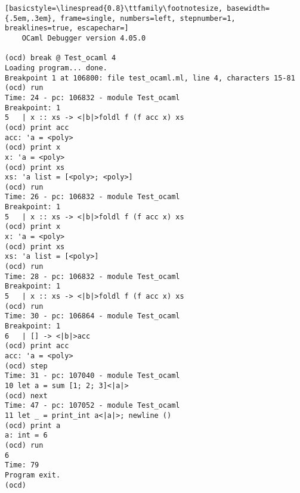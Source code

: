 \begin{lstlisting}[basicstyle=\linespread{0.8}\ttfamily\footnotesize, basewidth={.5em,.3em}, frame=single, numbers=left, stepnumber=1, breaklines=true, escapechar=]
	OCaml Debugger version 4.05.0

(ocd) break @ Test_ocaml 4
Loading program... done.
Breakpoint 1 at 106800: file test_ocaml.ml, line 4, characters 15-81
(ocd) run
Time: 24 - pc: 106832 - module Test_ocaml
Breakpoint: 1
5   | x :: xs -> <|b|>foldl f (f acc x) xs
(ocd) print acc
acc: 'a = <poly>
(ocd) print x
x: 'a = <poly>
(ocd) print xs
xs: 'a list = [<poly>; <poly>]
(ocd) run
Time: 26 - pc: 106832 - module Test_ocaml
Breakpoint: 1
5   | x :: xs -> <|b|>foldl f (f acc x) xs
(ocd) print x
x: 'a = <poly>
(ocd) print xs
xs: 'a list = [<poly>]
(ocd) run
Time: 28 - pc: 106832 - module Test_ocaml
Breakpoint: 1
5   | x :: xs -> <|b|>foldl f (f acc x) xs
(ocd) run
Time: 30 - pc: 106864 - module Test_ocaml
Breakpoint: 1
6   | [] -> <|b|>acc
(ocd) print acc
acc: 'a = <poly>
(ocd) step
Time: 31 - pc: 107040 - module Test_ocaml
10 let a = sum [1; 2; 3]<|a|>
(ocd) next
Time: 47 - pc: 107052 - module Test_ocaml
11 let _ = print_int a<|a|>; newline ()
(ocd) print a
a: int = 6
(ocd) run
6
Time: 79
Program exit.
(ocd)
\end{lstlisting}